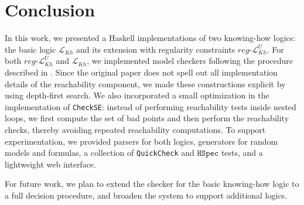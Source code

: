
\section{Conclusion}\label{sec:Conclusion}

In this work, we presented a Haskell implementations of two knowing-how logics: the basic logic $\mathcal{L}_{Kh}$ and its extension with regularity constraints $reg\text{-}\mathcal{L}^U_{Kh}$. For both $reg\text{-}\mathcal{L}^U_{Kh}$ and $\mathcal{L}_{Kh}$, we implemented model checkers following the procedure described in \cite{Demri2023}. Since the original paper does not spell out all implementation details of the reachability component, we made these constructions explicit by using depth-first search. We also incorporated a small optimization in the implementation of \texttt{CheckSE}: instead of performing reachability tests inside nested loops, we first compute the set of bad points and then perform the reachability checks, thereby avoiding repeated reachability computations. To support experimentation, we provided parsers for both logics, generators for random models and formulas, a collection of \texttt{QuickCheck} and $\texttt{HSpec}$ tests, and a lightweight web interface. 

For future work, we plan to extend the checker for the basic knowing-how logic to a full decision procedure, and broaden the system to support additional logics.


